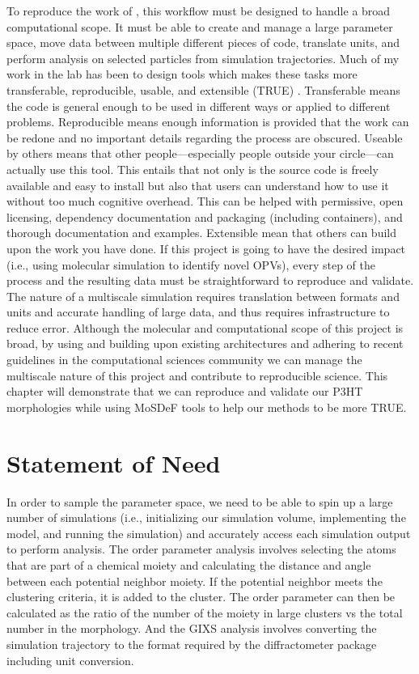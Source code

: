 To reproduce the work of \citet{Miller2018}, this workflow must be designed to handle a broad computational scope.
It must be able to create and manage a large parameter space, move data between multiple different pieces of code, translate units, and perform analysis on selected particles from simulation trajectories.
Much of my work in the lab has been to design tools which makes these tasks more transferable, reproducible, usable, and extensible (TRUE) \citep{Thompson2020}.
Transferable means the code is general enough to be used in different ways or applied to different problems.
Reproducible means enough information is provided that the work can be redone and no important details regarding the process are obscured.
Useable by others means that other people---especially people outside your circle---can actually use this tool. This entails that not only is the source code is freely available and easy to install but also that users can understand how to use it without too much cognitive overhead. This can be helped with permissive, open licensing, dependency documentation and packaging (including containers), and thorough documentation and examples.
Extensible mean that others can build upon the work you have done.
If this project is going to have the desired impact (i.e., using molecular simulation to identify novel OPVs), every step of the process and the resulting data must be straightforward to reproduce and validate.
The nature of a multiscale simulation requires translation between formats and units and accurate handling of large data, and thus requires infrastructure to reduce error.
Although the molecular and computational scope of this project is broad, by using and building upon existing architectures and adhering to recent guidelines in the computational sciences community we can manage the multiscale nature of this project and contribute to reproducible science.
This chapter will demonstrate that we can reproduce and validate our P3HT morphologies while using MoSDeF tools to help our methods to be more TRUE.

\section{Statement of Need}

In order to sample the parameter space, we need to be able to spin up a large number of simulations (i.e., initializing our simulation volume, implementing the model, and running the simulation) and accurately access each simulation output to perform analysis.
The order parameter analysis involves selecting the atoms that are part of a chemical moiety and calculating the distance and angle between each potential neighbor moiety. 
If the potential neighbor meets the clustering criteria, it is added to the cluster.
The order parameter can then be calculated as the ratio of the number of the moiety in large clusters vs the total number in the morphology.
And the GIXS analysis involves converting the simulation trajectory to the format required by the diffractometer package including unit conversion.

